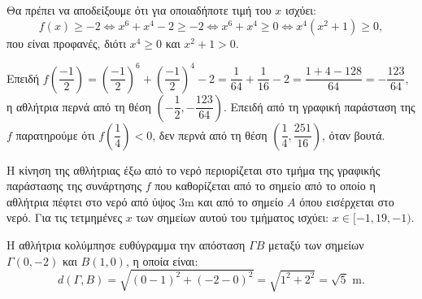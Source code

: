
\begin{alist}
\item Θα πρέπει να αποδείξουμε ότι για οποιαδήποτε τιμή του $x$ ισχύει:
\[f(x) \ge -2 \Leftrightarrow x^6 + x^4 - 2 \ge -2 \Leftrightarrow x^6 + x^4 \ge 0 \Leftrightarrow x^4 (x^2 + 1) \ge 0,\]
που είναι προφανές, διότι $x^4 \ge 0$ και $x^2 + 1 > 0$.

\item
\begin{rlist}
\item Επειδή $f\left(\dfrac{-1}{2}\right) = \left(\dfrac{-1}{2}\right)^6 + \left(\dfrac{-1}{2}\right)^4 - 2 = \dfrac{1}{64} + \dfrac{1}{16} - 2 = \dfrac{1+4-128}{64} = -\dfrac{123}{64}$, η αθλήτρια περνά από τη θέση $\left(-\dfrac{1}{2}, -\dfrac{123}{64}\right)$. Επειδή από τη γραφική παράσταση της $f$ παρατηρούμε ότι $f\left(\dfrac{1}{4}\right) < 0$, δεν περνά από τη θέση $\left(\dfrac{1}{4}, \dfrac{251}{16}\right)$, όταν βουτά.

\item Η κίνηση της αθλήτριας έξω από το νερό περιορίζεται στο τμήμα της γραφικής παράστασης της συνάρτησης $f$ που καθορίζεται από το σημείο από το οποίο η αθλήτρια πέφτει στο νερό από ύψος $3\text{m}$ και από το σημείο $A$ όπου εισέρχεται στο νερό. Για τις τετμημένες $x$ των σημείων αυτού του τμήματος ισχύει: $x \in [-1,19, -1)$.

\item Η αθλήτρια κολύμπησε ευθύγραμμα την απόσταση $\Gamma B$ μεταξύ των σημείων $\Gamma(0, -2)$ και $B(1, 0)$, η οποία είναι:
\[d(\Gamma, B) = \sqrt{(0 - 1)^2 + (-2 - 0)^2} = \sqrt{1^2 + 2^2} = \sqrt{5}\text{ m}.\]
\end{rlist}
\end{alist}

